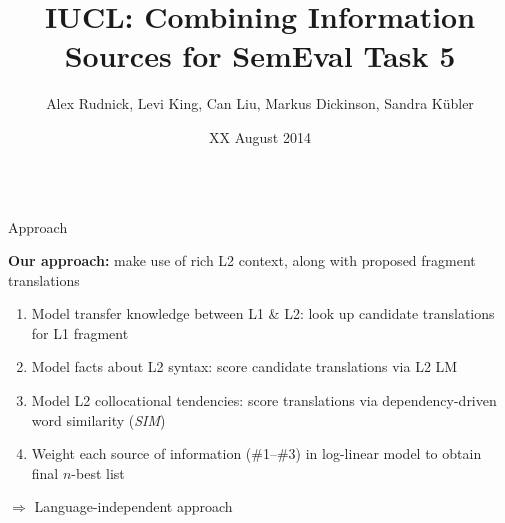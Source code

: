 \documentclass[final,t]{beamer}
\title[]{IUCL: Combining Information Sources for SemEval Task 5}
\author[]{Alex Rudnick, Levi King, Can Liu, Markus Dickinson, Sandra K\"ubler}
\institute[]{Indiana University}
\date[]{XX August 2014}
\begin{document}
\begin{frame}{}
  \begin{columns}[t]
    \begin{column}{.4\linewidth}

\begin{block}{Approach}

  \textbf{Our approach:} make use of rich L2 context, along with
  proposed fragment translations

  \medskip

  \begin{enumerate}
  \item Model transfer knowledge between L1 \& L2: look up candidate
    translations for L1 fragment
  \item Model facts about L2 syntax: score candidate translations via
    L2 LM
  \item Model L2 collocational tendencies: score translations via
    dependency-driven word similarity (\textit{SIM})
  \item Weight each source of information (\#1--\#3) in log-linear
    model to obtain final $n$-best list
  \end{enumerate}

  $\Rightarrow$ Language-independent approach


\end{block}
\end{column}
\end{columns}
\end{frame}
\end{document}
